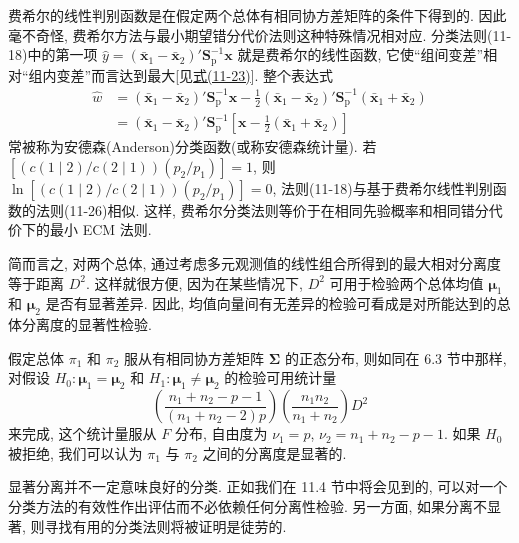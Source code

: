 
费希尔的线性判别函数是在假定两个总体有相同协方差矩阵的条件下得到的. 因此毫不奇怪, 费希尔方法与最小期望错分代价法则这种特殊情况相对应. 分类法则(11-18)中的第一项 $\hat{y}=(\bar{\mathbf{x}}_1-\bar{\mathbf{x}}_2)'\mathbf{S}_{\mathrm{p}}^{-1}\mathbf{x}$ 就是费希尔的线性函数, 它使“组间变差”相对“组内变差”而言达到最大[见\hyperref[eq:11-23]{式(11-23)}]. 整个表达式
\label{eq:11-26}
\begin{equation}
\begin{aligned}
\hat{w}&=(\bar{\mathbf{x}}_1-\bar{\mathbf{x}}_2)'\mathbf{S}_{\mathrm{p}}^{-1}\mathbf{x}-\frac{1}{2}(\bar{\mathbf{x}}_1-\bar{\mathbf{x}}_2)'\mathbf{S}_{\mathrm{p}}^{-1}(\bar{\mathbf{x}}_1+\bar{\mathbf{x}}_2)\\
&=(\bar{\mathbf{x}}_1-\bar{\mathbf{x}}_2)'\mathbf{S}_{\mathrm{p}}^{-1}\left[\mathbf{x}-\frac{1}{2}(\bar{\mathbf{x}}_1+\bar{\mathbf{x}}_2)\right]
\end{aligned}
\tag{11-26}
\end{equation}
常被称为安德森(Anderson)分类函数(或称安德森统计量). 若 $[(c(1\mid2)/c(2\mid1))(p_2/p_1)]=1$, 则 $\ln[(c(1\mid2)/c(2\mid1))(p_2/p_1)]=0$, 法则(11-18)与基于费希尔线性判别函数的法则(11-26)相似. 这样, 费希尔分类法则等价于在相同先验概率和相同错分代价下的最小 ECM 法则.


简而言之, 对两个总体, 通过考虑多元观测值的线性组合所得到的最大相对分离度等于距离 $D^2$. 这样就很方便, 因为在某些情况下, $D^2$ 可用于检验两个总体均值 $\boldsymbol{\mu}_1$ 和 $\boldsymbol{\mu}_2$ 是否有显著差异. 因此, 均值向量间有无差异的检验可看成是对所能达到的总体分离度的显著性检验.

假定总体 $\pi_1$ 和 $\pi_2$ 服从有相同协方差矩阵 $\boldsymbol{\Sigma}$ 的正态分布, 则如同在 6.3 节中那样, 对假设 $H_0:\boldsymbol{\mu}_1=\boldsymbol{\mu}_2$ 和 $H_1:\boldsymbol{\mu}_1\neq\boldsymbol{\mu}_2$ 的检验可用统计量
\[
\left(\frac{n_1+n_2-p-1}{(n_1+n_2-2)p}\right)\left(\frac{n_1n_2}{n_1+n_2}\right)D^2
\]
来完成, 这个统计量服从 $F$ 分布, 自由度为 $\nu_1=p$, $\nu_2=n_1+n_2-p-1$. 如果 $H_0$ 被拒绝, 我们可以认为 $\pi_1$ 与 $\pi_2$ 之间的分离度是显著的.

\noindent{}\quad 显著分离并不一定意味良好的分类. 正如我们在 11.4 节中将会见到的, 可以对一个分类方法的有效性作出评估而不必依赖任何分离性检验. 另一方面, 如果分离不显著, 则寻找有用的分类法则将被证明是徒劳的.



